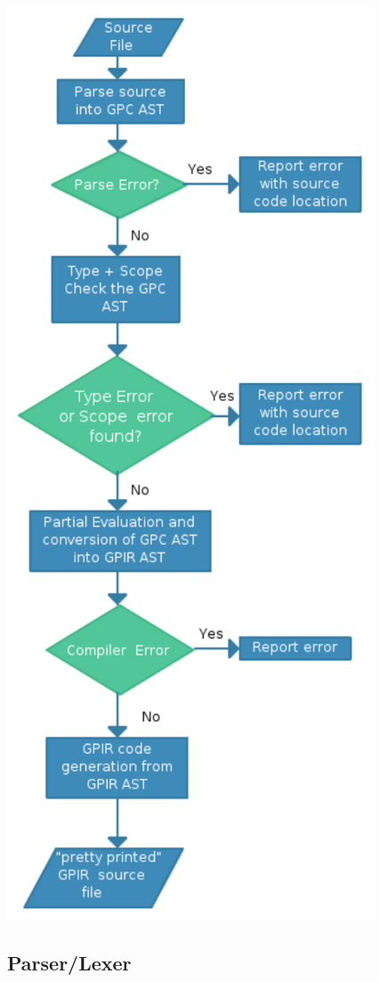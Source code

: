 \begin{center}
\includegraphics{graphs/Dissertation.pdf}
\end{center}
    
\subsection{Parser/Lexer}


